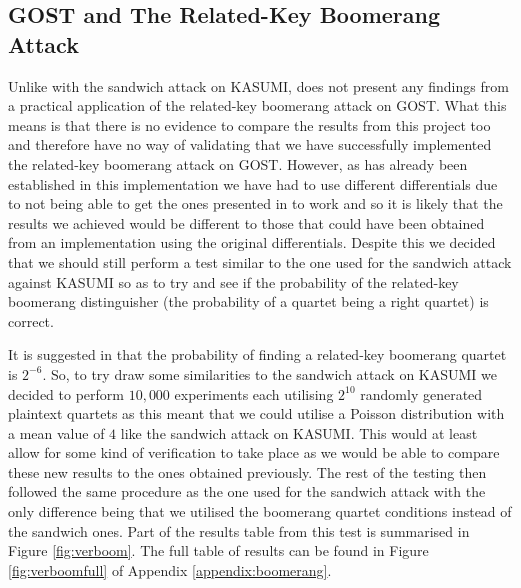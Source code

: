 \documentclass[10pt,journal,compsoc]{IEEEtran}
\begin{document}
\subsection{GOST and The Related-Key Boomerang Attack}
Unlike with the sandwich attack on KASUMI, \cite{cryptoeprint:2010/111} does not present any findings from a practical application of the related-key boomerang attack on GOST. What this means is that there is no evidence to compare the results from this project too and therefore have no way of validating that we have successfully implemented the related-key boomerang attack on GOST. However, as has already been established in this implementation we have had to use different differentials due to not being able to get the ones presented in \cite{cryptoeprint:2010/111} to work and so it is likely that the results we achieved would be different to those that could have been obtained from an implementation using the original differentials. Despite this we decided that we should still perform a test similar to the one used for the sandwich attack against KASUMI so as to try and see if the probability of the related-key boomerang distinguisher (the probability of a quartet being a right quartet) is correct. 

It is suggested in \cite{cryptoeprint:2010/111} that the probability of finding a related-key boomerang quartet is \(2^{-6}\). So, to try draw some similarities to the sandwich attack on KASUMI we decided to perform \(10,000\) experiments each utilising \(2^{10}\) randomly generated plaintext quartets as this meant that we could utilise a Poisson distribution with a mean value of \(4\) like the sandwich attack on KASUMI. This would at least allow for some kind of verification to take place as we would be able to compare these new results to the ones obtained previously. The rest of the testing then followed the same procedure as the one used for the sandwich attack with the only difference being that we utilised the boomerang quartet conditions instead of the sandwich ones. Part of the results table from this test is summarised in Figure \ref{fig:verboom}. The full table of results can be found in Figure \ref{fig:verboomfull} of Appendix \ref{appendix:boomerang}.
\end{document}
